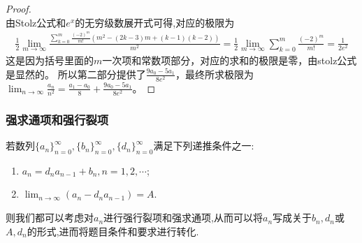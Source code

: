 \documentclass[../../main.tex]{subfiles}
\begin{document}
\begin{proof}
\[\]
由Stolz公式和$e^x$的无穷级数展开式可得,对应的极限为
\begin{align*}
\frac{1}{2}\lim_{m\rightarrow\infty}\frac{\sum\limits_{k = 0}^{m}\frac{(-2)^m}{m!}(m^2-(2k - 3)m+(k - 1)(k - 2))}{m^2}
=\frac{1}{2}\lim_{m\rightarrow\infty}\sum_{k = 0}^{m}\frac{(-2)^m}{m!}=\frac{1}{2e^2}
\end{align*}
这是因为括号里面的\(m\)一次项和常数项部分，对应的求和的极限是零，由stolz公式是显然的。
所以第二部分提供了\(\frac{9a_0 - 5a_1}{8e^2}\)，最终所求极限为\(\lim_{n\rightarrow\infty}\frac{a_n}{n^2}=\frac{a_1 - a_0}{8}+\frac{9a_0 - 5a_1}{8e^2}\)。
\end{proof}





\subsubsection{强求通项和强行裂项}

若数列\(\{ a_n \}_{n = 0}^{\infty}, \{ b_n \}_{n = 0}^{\infty}, \{ d_n \}_{n = 0}^{\infty}\)满足下列递推条件之一:
\begin{enumerate}
\item \(a_n = d_na_{n - 1} + b_n, n = 1, 2, \cdots\);
\item \(\lim_{n\rightarrow \infty}(a_n - d_na_{n - 1}) = A\).
\end{enumerate}
则我们都可以考虑对\(a_n\)进行强行裂项和强求通项,从而可以将\(a_n\)写成关于\(b_n, d_n\)或\(A, d_n\)的形式,进而将题目条件和要求进行转化.
\end{document}
